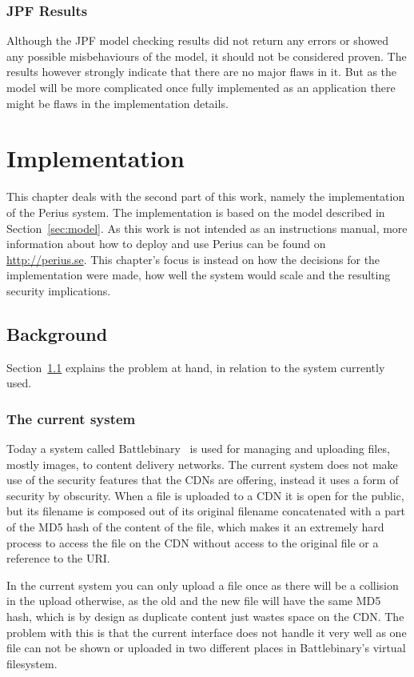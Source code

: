 \documentclass[a4paper,12pt]{article}
\begin{document}
\subsubsection{JPF Results}
Although the JPF model checking results did not return any errors or showed any possible misbehaviours
of the model, it should not be considered proven. The results however strongly indicate that there are no
major flaws in it. But as the model will be more complicated once fully implemented as an application
there might be flaws in the implementation details. 

\newpage 
\section{Implementation} \label{sec:implementation} 
This chapter deals with the second part of this work, namely the implementation of the Perius
system. The implementation is based on the model described in Section~\ref{sec:model}. As this work
is not intended as an instructions manual, more information about how to deploy and use Perius can
be found on \url{http://perius.se}. This chapter's focus is instead on how the decisions for the
implementation were made, how well the system would scale and the resulting security implications.

\subsection{Background} \label{sec:background}
Section~\ref{sec:background} explains the problem at hand, in relation to the system currently 
used.

\subsubsection{The current system} \label{sec:current_system}
Today a system called Battlebinary~\cite{BATTLEBINARY} is used for managing and uploading files,
mostly images, to content delivery networks. The current system does not make use of the
security features that the CDNs are offering, instead it uses a form of security by obscurity. When
a file is uploaded to a CDN it is open for the public, but its filename is composed out of its
original filename concatenated with a part of the MD5 hash of the content of the file, which makes
it an extremely hard process to access the file on the CDN without access to the original file or a
reference to the URI.

In the current system you can only upload a file once as there will be a collision in the upload
otherwise, as the old and the new file will have the same MD5 hash, which is by design as duplicate
content just wastes space on the CDN. The problem with this is that the current interface does not
handle it very well as one file can not be shown or uploaded in two different places in 
Battlebinary's virtual filesystem.
\end{document}
